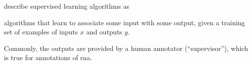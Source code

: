 


\textcite{goodfellow2016deep} describe supervised learning
algorithms as

\begin{italicquotes}
    algorithms that learn to associate some input with some
    output, given a training set of examples of inputs $x$
    and outputs $y$.
\end{italicquotes}

Commonly, the outputs are provided by a human annotator
(``supervisor''), which is true for annotations of
\gls{rna}.

